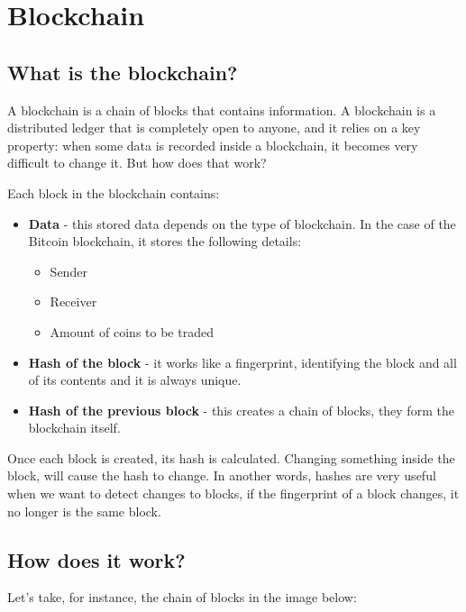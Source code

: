 \documentclass{article}
\newcommand\tab[1][1cm]{\hspace*{#1}}
\begin{document}
\section{Blockchain}

\subsection{What is the blockchain?}

\tab A blockchain is a chain of blocks that contains information. A blockchain is a distributed ledger that is completely open to anyone, and it relies on a key property: when some data is recorded inside a blockchain, it becomes very difficult to change it. But how does that work?

Each block in the blockchain contains:

\begin{itemize}
    \item \textbf{Data} - this stored data depends on the type of blockchain. In the case of the Bitcoin blockchain, it stores the following details:
    \begin{itemize}
        \item Sender
        \item Receiver
        \item Amount of coins to be traded
    \end{itemize}
    \item \textbf{Hash of the block} - it works like a fingerprint, identifying the block and all of its contents and it is always unique.
    \item \textbf{Hash of the previous block} - this creates a chain of blocks, they form the blockchain itself.
\end{itemize}

Once each block is created, its hash is calculated. Changing something inside the block, will cause the hash to change. In another words, hashes are very useful when we want to detect changes to blocks, if the fingerprint of a block changes, it no longer is the same block.

\subsection{How does it work?}

\tab Let's take, for instance, the chain of blocks in the image below:
\end{document}
